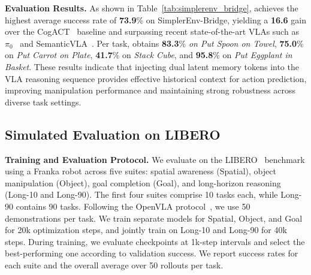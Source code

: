 \noindent\textbf{Evaluation Results.}
As shown in Table~\ref{tab:simplerenv_bridge}, \ourmethod achieves the highest average success rate of \textbf{73.9}\% on SimplerEnv-Bridge, yielding a \textbf{16.6} gain over the CogACT~\cite{li2024cogact} baseline and surpassing recent state-of-the-art VLAs such as $\pi_0$~\cite{black2024pi_0} and SemanticVLA~\citep{ni2026semanticvla}. Per task, \ourmethod obtains \textbf{83.3}\% \textit{on Put Spoon on Towel}, \textbf{75.0}\% on \textit{Put Carrot on Plate}, \textbf{41.7}\% on \textit{Stack Cube}, and \textbf{95.8}\% on \textit{Put Eggplant in Basket}. These results indicate that injecting dual latent memory tokens into the VLA reasoning sequence provides effective historical context for action prediction, improving manipulation performance and maintaining strong robustness across diverse task settings.

\subsection{Simulated  Evaluation on LIBERO}
\label{sec:libero}
\noindent\textbf{Training and Evaluation Protocol.}
We evaluate \ourmethod on the LIBERO~\cite{liu2023libero} benchmark using a Franka robot across five suites: spatial awareness (Spatial), object manipulation (Object), goal completion (Goal), and long-horizon reasoning (Long-10 and Long-90). The first four suites comprise 10 tasks each, while Long-90 contains 90 tasks. Following the OpenVLA protocol~\cite{kim2025openvla}, we use 50 demonstrations per task. We train separate models for Spatial, Object, and Goal for 20k optimization steps, and jointly train on Long-10 and Long-90 for 40k steps. During training, we evaluate checkpoints at 1k-step intervals and select the best-performing one according to validation success. We report success rates for each suite and the overall average over 50 rollouts per task.

